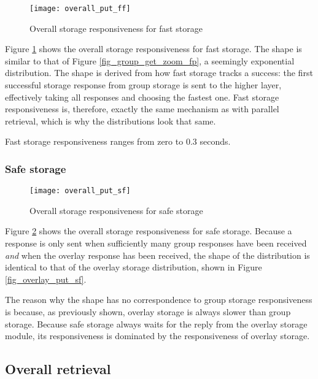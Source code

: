 \begin{figure}[htbp]
 \centering
 \texttt{[image: overall\_put\_ff]}
 \caption{Overall storage responsiveness for fast storage}
 \label{fig_overall_put_ff}
\end{figure}
%
Figure \ref{fig_overall_put_ff} shows the overall storage responsiveness for fast storage. The shape is similar to that of Figure \ref{fig_group_get_zoom_fp}, a seemingly exponential distribution. The shape is derived from how fast storage tracks a success: the first successful storage response from group storage is sent to the higher layer, effectively taking all responses and choosing the fastest one. Fast storage responsiveness is, therefore, exactly the same mechanism as with parallel retrieval, which is why the distributions look that same.

Fast storage responsiveness ranges from zero to 0.3 seconds.

\subsubsection{Safe storage}
\begin{figure}[htbp]
 \centering
 \texttt{[image: overall\_put\_sf]}
 \caption{Overall storage responsiveness for safe storage}
 \label{fig_overall_put_sf}
\end{figure}
%
Figure \ref{fig_overall_put_sf} shows the overall storage responsiveness for safe storage. Because a response is only sent when sufficiently many group responses have been received \emph{and} when the overlay response has been received, the shape of the distribution is identical to that of the overlay storage distribution, shown in Figure \ref{fig_overlay_put_sf}.

The reason why the shape has no correspondence to group storage responsiveness is because, as previously shown, overlay storage is always slower than group storage. Because safe storage always waits for the reply from the overlay storage module, its responsiveness is dominated by the responsiveness of overlay storage.

\subsection{Overall retrieval}
